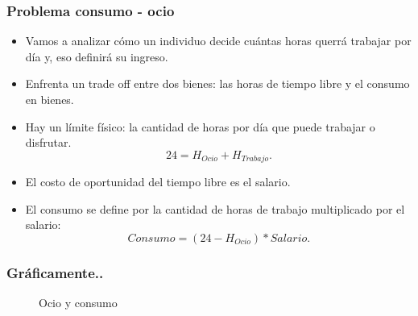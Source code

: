 \documentclass{beamer}
\begin{document}
\begin{frame}
\frametitle{Problema consumo - ocio}
\begin{itemize}
    \item Vamos a analizar cómo un individuo decide cuántas horas querrá trabajar por día y, eso definirá su ingreso.
    \item Enfrenta un trade off entre dos bienes: las horas de tiempo libre y el consumo en bienes.
    \item Hay un límite físico: la cantidad de horas por día que puede trabajar o disfrutar.
    \begin{equation}
     24 = H_{Ocio} + H_{Trabajo}.
    \end{equation}
    \item El costo de oportunidad del tiempo libre es el salario. 
    \item El consumo se define por la cantidad de horas de trabajo multiplicado por el salario:
    \begin{equation}
    Consumo = (24-H_{Ocio}) * Salario. 
    \end{equation}
\end{itemize}
\end{frame}


\begin{frame}
\frametitle{Gráficamente..}
\begin{center}
\begin{figure}[H]
\renewcommand{\figurename}{Figure}
\begin{center}
\end{center}
\caption{Ocio y consumo}
\label{fig:C6.17}
\end{figure}
\end{center}
\end{frame}
\end{document}
